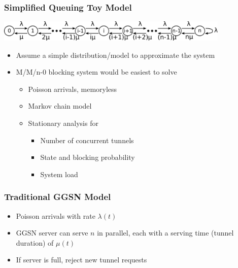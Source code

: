 \documentclass{beamer}
\begin{document}
\begin{frame}
	\frametitle{Simplified Queuing Toy Model}

	\begin{centering}
		\includegraphics[height=1cm]{figures/markovchain.pdf}
	\end{centering}

	\begin{itemize}
		\item Assume a simple distribution/model to approximate the system
		\item M/M/n-0 blocking system would be easiest to solve
		\begin{itemize}
			\item Poisson arrivals, memoryless
			\item Markov chain model
			\item Stationary analysis for
			\begin{itemize}
				\item Number of concurrent tunnels
				\item State and blocking probability
				\item System load
			\end{itemize}
		\end{itemize}
	\end{itemize}
\end{frame}

\begin{frame}
	\frametitle{Traditional GGSN Model}
		\begin{center}
		\resizebox{!}{4cm}{%
			
		}
		\end{center}

		\begin{itemize}
			\item Poisson arrivals with rate $\lambda(t)$
			\item GGSN server can serve $n$ in parallel, each with a serving time (tunnel duration) of $\mu(t)$
			\item If server is full, reject new tunnel requests
		\end{itemize}

\end{frame}
\end{document}
